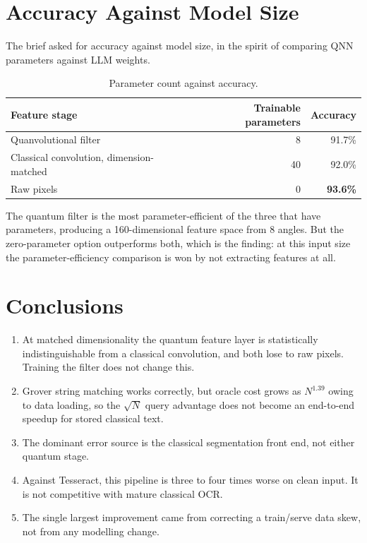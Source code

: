 \documentclass[11pt,a4paper]{article}
\begin{document}
\section{Accuracy Against Model Size}

The brief asked for accuracy against model size, in the spirit of comparing QNN
parameters against LLM weights.

\begin{table}[h]
\centering
\caption{Parameter count against accuracy.}
\begin{tabular}{@{}lrr@{}}
\toprule
Feature stage & Trainable parameters & Accuracy \\
\midrule
Quanvolutional filter & 8 & 91.7\% \\
Classical convolution, dimension-matched & 40 & 92.0\% \\
Raw pixels & 0 & \textbf{93.6\%} \\
\bottomrule
\end{tabular}
\end{table}

The quantum filter is the most parameter-efficient of the three that have
parameters, producing a 160-dimensional feature space from 8 angles. But the
zero-parameter option outperforms both, which is the finding: at this input size
the parameter-efficiency comparison is won by not extracting features at all.

\section{Conclusions}

\begin{enumerate}
\item At matched dimensionality the quantum feature layer is statistically
      indistinguishable from a classical convolution, and both lose to raw
      pixels. Training the filter does not change this.
\item Grover string matching works correctly, but oracle cost grows as
      $N^{1.39}$ owing to data loading, so the $\sqrt{N}$ query advantage does
      not become an end-to-end speedup for stored classical text.
\item The dominant error source is the classical segmentation front end, not
      either quantum stage.
\item Against Tesseract, this pipeline is three to four times worse on clean
      input. It is not competitive with mature classical OCR.
\item The single largest improvement came from correcting a train/serve data
      skew, not from any modelling change.
\end{enumerate}
\end{document}
